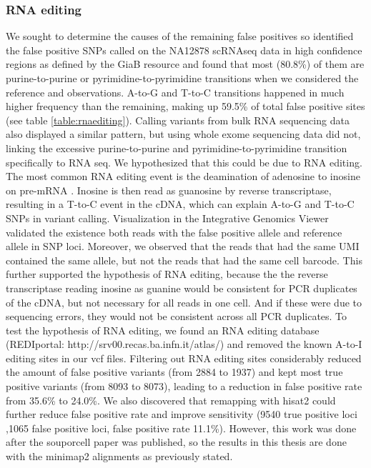 \subsubsection{RNA editing}
\par{
We sought to determine the causes of the remaining false positives so identified the false positive SNPs called on the NA12878 scRNAseq data in high confidence regions as defined by the GiaB resource and found that most (80.8\%) of them are purine-to-purine or pyrimidine-to-pyrimidine transitions when we considered the reference and observations. A-to-G and T-to-C transitions happened in much higher frequency than the remaining, making up 59.5\% of
total false positive sites (see table \ref{table:rnaediting}). Calling variants from bulk RNA sequencing data also
displayed a similar pattern, but using whole exome sequencing data did not, linking the
excessive purine-to-purine and pyrimidine-to-pyrimidine transition specifically to RNA seq. We hypothesized that this could be due to RNA editing. The most common RNA editing event is the
deamination of adenosine to inosine on pre-mRNA \cite{atoi}. Inosine is then read as guanosine by
reverse transcriptase, resulting in a T-to-C event in the cDNA, which can explain A-to-G and T-to-C SNPs in variant calling. Visualization in the Integrative Genomics Viewer \cite{IGV} validated the
existence both reads with the false positive allele and reference allele in SNP loci. Moreover, we observed
that the reads that had the same UMI contained the same allele, but not the reads that had
the same cell barcode. This further supported the hypothesis of RNA editing, because the the reverse transcriptase reading inosine as guanine would be consistent for PCR duplicates of the cDNA, but
not necessary for all reads in one cell. And if these were due to sequencing errors, they would not be consistent across all PCR duplicates. To test the hypothesis of RNA editing, we found an RNA editing database (REDIportal\cite{rnaediting}: http://srv00.recas.ba.infn.it/atlas/) and removed the known A-to-I editing sites in our vcf files.
Filtering out RNA editing sites considerably reduced the amount of false positive variants (from
2884 to 1937) and kept most true positive variants (from 8093 to 8073), leading to a reduction
in false positive rate from 35.6\% to 24.0\%. We also discovered that remapping with hisat2
could further reduce false positive rate and improve sensitivity (9540 true positive loci ,1065
false positive loci, false positive rate 11.1\%). However, this work was done after the souporcell paper was published, so the results in this thesis are done with the minimap2 alignments as previously stated.
}

